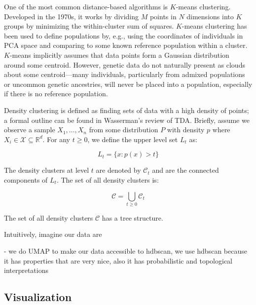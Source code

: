 One of the most common distance-based algorithms is $K$-means clustering. Developed in the 1970s, it works by dividing $M$ points in $N$ dimensions into $K$ groups by minimizing the within-cluster sum of squares\citep{hartigan_algorithm_1979}. $K$-means clustering has been used to define populations by, e.g., using the coordinates of individuals in PCA space and comparing to some known reference population within a cluster. $K$-means implicitly assumes that data points form a Gaussian distribution around some centroid\citep{mcinnes_accelerated_2017}. However, genetic data do not naturally present as clouds about some centroid---many individuals, particularly from admixed populations or uncommon genetic ancestries, will never be placed into a population, especially if there is no reference population\citep{ding_polygenic_2023}.

Density clustering is defined as finding sets of data with a high density of points; a formal outline can be found in Wasserman's review of TDA\citep{wasserman_topological_2018}. Briefly, assume we observe a sample $X_{1}, \dots , X_{n}$ from some distribution $P$ with density $p$ where $X_{i} \in \mathcal{X} \subseteq \mathbb{R}^d$. For any $t \ge 0$, we define the upper level set $L_{t}$ as:

$$L_{t} = \{x: p(x) > t \}$$

The density clusters at level $t$ are denoted by $\mathcal{C}_{t}$ and are the connected components of $L_{t}$. The set of all density clusters is:

$$ \mathcal{C} = \bigcup_{t \ge 0} \mathcal{C}_{t} $$

The set of all density clusters $\mathcal{C}$ has a tree structure. 

Intuitively, imagine our data are 

- we do UMAP to make our data accessible to hdbscan, we use hdbscan because it has properties that are very nice, also it has probabilistic and topological interpretations

\citep{malzer_hybrid_2020}

\cite{mcinnes_accelerated_2017}


\subsection{Visualization}




